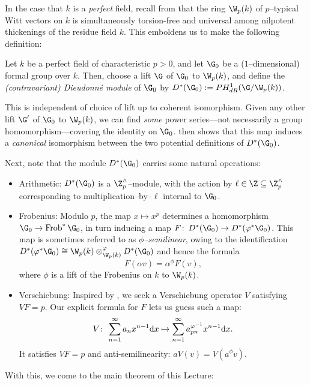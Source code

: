 In the case that \(k\) is a \emph{perfect} field, recall from  that the ring \(\W_p(k)\) of \(p\)--typical Witt vectors on \(k\) is simultaneously torsion-free and universal among nilpotent thickenings of the residue field \(k\).  This emboldens us to make the following definition:

\begin{definition}{\cite[Section 5.5]{Katz}}\label{ContravariantDieudonneDefn}
Let \(k\) be a perfect field of characteristic \(p > 0\), and let \(\G_0\) be a (\(1\)--dimensional) formal group over \(k\).  Then, choose a lift \(\G\) of \(\G_0\) to \(\W_p(k)\), and define the \textit{(contravariant) Dieudonn\'e module} of \(\G_0\) by \(D^*(\G_0) := PH^1_{dR}(\G / \W_p(k))\).
\end{definition}

\begin{remark}
This is independent of choice of lift up to coherent isomorphism.  Given any other lift \(\G'\) of \(\G_0\) to \(\W_p(k)\), we can find \emph{some} power series---not necessarily a group homomorphism---covering the identity on \(\G_0\).   then shows that this map induces a \emph{canonical} isomorphism between the two potential definitions of \(D^*(\G_0)\).
\end{remark}

Next, note that the module \(D^*(\G_0)\) carries some natural operations:
\begin{itemize}
\item Arithmetic: \(D^*(\G_0)\) is a \(\Z^\wedge_p\)--module, with the action by \(\ell \in \Z \subseteq \Z^\wedge_p\) corresponding to multiplication--by--\(\ell\) internal to \(\G_0\).
\item {}Frobenius: Modulo \(p\), the map \(x \mapsto x^p\) determines a homomorphism \(\G_0 \to \operatorname{Frob}^* \G_0\), in turn inducing a map \(F\co D^*(\G_0) \to D^*(\phi^* \G_0)\).  This map is sometimes referred to as \textit{\(\phi\)--semilinear}, owing to the identification \(D^*(\phi^* \G_0) \cong \W_p(k) \otimes^\phi_{\W_p(k)} D^*(\G_0)\) and hence the formula \[F(\alpha v) = \alpha^\phi F(v),\] where \(\phi\) is a lift of the Frobenius on \(k\) to \(\W_p(k)\).
\item {}Verschiebung: Inspired by , we seek a Verschiebung operator \(V\) satisfying \(VF = p\).  Our explicit formula for \(F\) lets us guess such a map: \[V\colon\thinspace \sum_{n=1}^\infty a_n x^{n-1} \mathrm{d}x \mapsto \sum_{n=1}^\infty a_{pn}^{\varphi^{-1}} x^{n-1} \mathrm{d}x.\]  It satisfies \(VF = p\) and anti-semilinearity: \(aV(v) = V(a^\phi v)\).
\end{itemize}
With this, we come to the main theorem of this Lecture:

